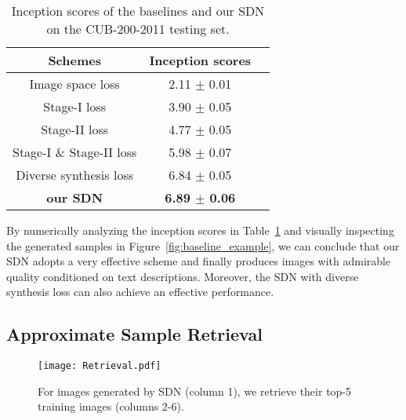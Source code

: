 \documentclass[sigconf]{acmart}
\begin{document}
\begin{table}[htb]
	\caption{Inception scores of the baselines and our SDN on the CUB-200-2011 testing set.}
	\begin{center}
		\begin{tabular}{|c|c|c|} 
			\hline
			Schemes & Inception scores\\
			\hline
			Image space loss & 2.11 $\pm$ 0.01 \\
			Stage-I loss & 3.90 $\pm$ 0.05 \\
			Stage-II loss & 4.77 $\pm$ 0.05 \\
			Stage-I \& Stage-II loss & 5.98 $\pm$ 0.07 \\
			Diverse synthesis loss & 6.84 $\pm$ 0.05 \\
			\textbf{our SDN} & \textbf{6.89 $\pm$ 0.06} \\
			\hline
		\end{tabular} 
	\end{center}
	\label{table:Baseline}
\end{table}

By numerically analyzing the inception scores in Table~\ref{table:Baseline} and visually inspecting the generated samples in Figure~\ref{fig:baseline_example}, we can conclude that our SDN adopts a very effective scheme and finally produces images with admirable quality conditioned on text descriptions. Moreover, the SDN with diverse synthesis loss can also achieve an effective performance.

\subsection{Approximate Sample Retrieval}

\begin{figure}[t]
	\begin{center}
		\texttt{[image: Retrieval.pdf]}
	\end{center}
	\caption{For images generated by SDN (column 1), we retrieve their top-5 training images (columns 2-6).}
	\label{fig:retrieval}
\end{figure}
\end{document}
